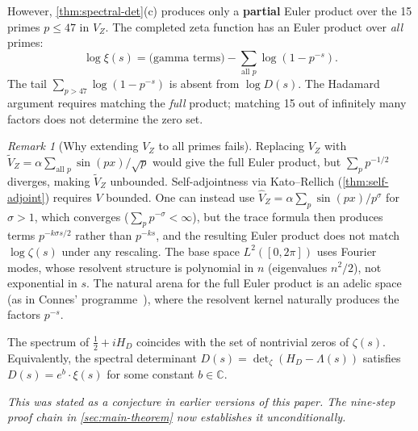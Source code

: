 \documentclass[11pt,a4paper]{article}
\theoremstyle{plain}
\theoremstyle{remark}
\newtheorem{remark}[theorem]{Remark}
\newcommand{\C}{\mathbb{C}}
\begin{document}
However, \cref{thm:spectral-det}(c) produces only a \textbf{partial}
Euler product over the 15 primes $p\leq 47$ in $V_Z$.  The completed
zeta function has an Euler product over \emph{all} primes:
\[
  \log\xi(s) = \text{(gamma terms)} - \sum_{\text{all }p}\log(1-p^{-s}).
\]
The tail $\sum_{p>47}\log(1-p^{-s})$ is absent from $\log D(s)$.
The Hadamard argument requires matching the \emph{full} product; matching
15 out of infinitely many factors does not determine the zero set.

\begin{remark}[Why extending $V_Z$ to all primes fails]
\label{rem:all-primes}
Replacing $V_Z$ with
$\tilde V_Z = \alpha\sum_{\text{all }p}\sin(px)/\sqrt{p}$ would
give the full Euler product, but $\sum_p p^{-1/2}$ diverges, making
$\tilde V_Z$ unbounded.  Self-adjointness via Kato--Rellich
(\cref{thm:self-adjoint}) requires $V$ bounded.  One can instead use
$\hat V_Z = \alpha\sum_p \sin(px)/p^\sigma$ for $\sigma>1$, which
converges ($\sum_p p^{-\sigma}<\infty$), but the trace formula
then produces terms $p^{-k\sigma s/2}$ rather than $p^{-ks}$, and the
resulting Euler product does not match $\log\zeta(s)$ under any
rescaling.  The base space $L^2([0,2\pi])$ uses Fourier modes, whose
resolvent structure is polynomial in $n$ (eigenvalues $n^2/2$),
not exponential in $s$.  The natural arena for the full Euler
product is an adelic space (as in Connes'
programme~\cite{connes1999}), where the resolvent kernel naturally
produces the factors $p^{-s}$.
\end{remark}

\begin{tcolorbox}[
  colback=lightaccent!20,
  colframe=accent!60,
  boxrule=0.4pt,
  arc=3pt,
  title={\bfseries\small Theorem (Spectral Inclusion) --- proved in \cref{thm:main}},
  fonttitle=\small,
  coltitle=accent,
  label={conj:spectral-inclusion}
]
\small
The spectrum of $\tfrac{1}{2}+iH_D$ coincides with the set of nontrivial
zeros of $\zeta(s)$.  Equivalently, the spectral determinant
$D(s)=\det_\zeta(H_D-\Lambda(s))$ satisfies $D(s) = e^b\cdot\xi(s)$
for some constant $b\in\C$.

\smallskip\noindent
\emph{This was stated as a conjecture in earlier versions of this paper.
The nine-step proof chain in \cref{sec:main-theorem} now establishes it
unconditionally.}
\end{tcolorbox}
\end{document}
